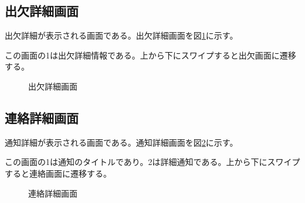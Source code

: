 \documentclass[a4j,12pt,onecolumn,oneside,titlepage,openany,final]{jreport}
\begin{document}
\subsection{出欠詳細画面}
出欠詳細が表示される画面である。出欠詳細画面を図\ref{shuke_del}に示す。

この画面の1は出欠詳細情報である。上から下にスワイプすると出欠画面に遷移する。


\begin{figure}[htbp]
  \centering %
  \caption{出欠詳細画面}\label{shuke_del}
\end{figure}

\subsection{連絡詳細画面}
通知詳細が表示される画面である。通知詳細画面を図\ref{tuchi_del}に示す。

この画面の1は通知のタイトルであり。2は詳細通知である。上から下にスワイプすると連絡画面に遷移する。


\begin{figure}[htbp]
  \centering %
  \caption{連絡詳細画面}\label{tuchi_del}
\end{figure}
\end{document}
